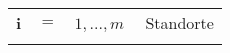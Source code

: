 \renewcommand\baselinestretch{1.25}\selectfont

\begin{table}[h]
\begin{tabular}{lll}
\bigskip
\textbf{i}   &  $=$  & $ 1,...,m$ \ \ Standorte \\ \bigskip
\end{tabular}
\end{table}

\renewcommand\baselinestretch{1}\selectfont